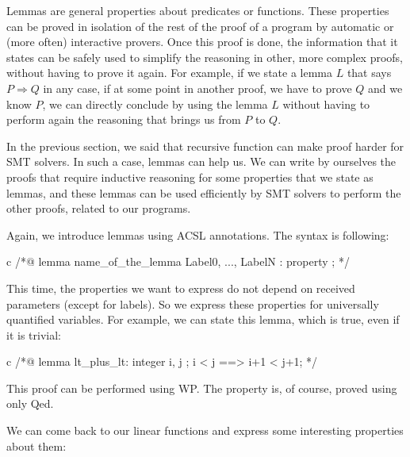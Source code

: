 Lemmas are general properties about predicates or functions. These properties
can be proved in isolation of the rest of the proof of a program by automatic or
(more often) interactive provers. Once this proof is done, the information that
it states can be safely used to simplify the reasoning in other, more complex
proofs, without having to prove it again. For example, if we state a lemma $L$
that says $P \Rightarrow Q$ in any case, if at some point in another proof, we
have to prove $Q$ and we know $P$, we can directly conclude by using the lemma
$L$ without having to perform again the reasoning that brings us from $P$ to
$Q$.


In the previous section, we said that recursive function can make proof harder
for SMT solvers. In such a case, lemmas can help us. We can write by ourselves
the proofs that require inductive reasoning for some properties that we state as
lemmas, and these lemmas can be used efficiently by SMT solvers to perform the
other proofs, related to our programs.




Again, we introduce lemmas using ACSL annotations. The syntax is
following:



\begin{CodeBlock}{c}
/*@
  lemma name_of_the_lemma { Label0, ..., LabelN }:
    property ;
*/
\end{CodeBlock}



This time, the properties we want to express do not depend on received
parameters (except for labels). So we express these properties for universally
quantified variables. For example, we can state this lemma, which is true, even
if it is trivial:



\begin{CodeBlock}{c}
/*@
  lemma lt_plus_lt:
    \forall integer i, j ; i < j ==> i+1 < j+1;
*/
\end{CodeBlock}



This proof can be performed using WP. The property is, of course, proved
using only Qed.





We can come back to our linear functions and express some interesting
properties about them:



